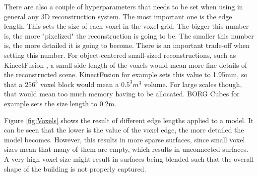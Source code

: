 \documentclass[12pt]{article}
\begin{document}
There are also a couple of hyperparameters that needs to be set when using in general any 3D reconstruction system. The most important one is the edge length. This sets the size of each voxel in the voxel grid. The bigger this number is, the more "pixelized" the reconstruction is going to be. The smaller this number is, the more detailed it is going to become. There is an important trade-off when setting this number. For object-centered small-sized reconstructions, such as KinectFusion \cite{kinectfusion}, a small side-length of the voxels would mean more fine details of the reconstructed scene. KinectFusion for example sets this value to	 1.95mm, so that a $256^3$ voxel block would mean a $0.5^3 m^3$ volume. For large scales though, that would mean too much memory having to be allocated. BORG Cubes for example sets the size length to 0.2m.
	
Figure \ref{fig:Voxels} shows the result of different edge lengths applied to a model. It can be seen that the lower is the value of the voxel edge, the more detailed the model becomes. However, this results in more sparse surfaces, since small voxel sizes mean that many of them are empty, which results in unconnected surfaces. A very high voxel size might result in surfaces being blended such that the overall shape of the building is not properly captured.
\end{document}
